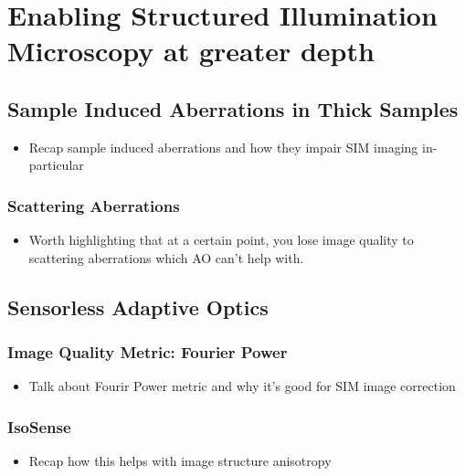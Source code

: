 \chapter{Enabling Structured Illumination Microscopy at greater depth}

\section{Sample Induced Aberrations in Thick Samples}
\label{sec:sample_aberrations_thick}

\begin{itemize}
	\item Recap sample induced aberrations and how they impair SIM imaging in-particular
\end{itemize}

	\subsection{Scattering Aberrations}
	\label{subsec:scattering}
	
	\begin{itemize}
		\item Worth highlighting that at a certain point, you lose image quality to scattering aberrations which AO can't help with.
	\end{itemize}

\section{Sensorless Adaptive Optics}
\label{sec:sensorless_AO}

	\subsection{Image Quality Metric: Fourier Power}
	\label{subsec:fourier_power_metric}
	
	\begin{itemize}
		\item Talk about Fourir Power metric and why it's good for SIM image correction
	\end{itemize}

	\subsection{IsoSense}
	\label{subsec:isosense}
	
	\begin{itemize}
		\item Recap how this helps with image structure anisotropy
	\end{itemize}


